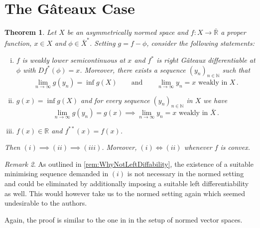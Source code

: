 \documentclass[
	paper=A4,
	pagesize=auto,
	fontsize=12pt
]{scrartcl}
\theoremstyle{plain}
\newtheorem{theorem}{Theorem}[section]
\theoremstyle{remark}
\newtheorem{remark}[theorem]{Remark}
\theoremstyle{definition}
\begin{document}
\section{The Gâteaux Case}
%
\begin{theorem}
Let $X$ be an asymmetrically normed space and $f : X \to \overline{\mathbb{R}}$ a proper function, $x \in X$ and $\phi \in \bar{X}^*$.
Setting $g = f - \phi$, consider the following statements:
%
\begin{enumerate}[(i)]
\item $f$ is weakly lower semicontinuous at $x$ and $f^*$ is right Gâteaux differentiable at $\phi$ with $D f^* (\phi) = x$.
Moreover, there exists a sequence $(y_n)_{n \in \mathbb{N}}$ such that
\begin{equation}
\lim_{n \to \infty} g(y_n) = \inf g(X) \qquad\text{and}\qquad \lim_{n \to \infty} y_n = x \text{ weakly in } X \, .
\end{equation}
\item $g(x) =  \inf g(X)$ and for every sequence $(y_n)_{n \in \mathbb{N}}$ in $X$ we have
\begin{equation}
 \lim_{n \to \infty} g(y_n) = g(x) \implies \lim_{n \to \infty} y_n = x \text{ weakly in } \bar{X} \, .
\end{equation}
\item $f(x) \in \mathbb{R}$ and $f^{**}(x) = f(x)$.
\end{enumerate}
%
Then $(i) \implies (ii) \implies (iii)$.
Moreover, $(i) \iff (ii)$ whenever $f$ is convex.
\end{theorem}
%
\begin{remark}
As outlined in \cref{rem:WhyNotLeftDiffability}, the existence of a suitable minimising sequence demanded in $(i)$ is not necessary in the normed setting and could be eliminated by additionally imposing a suitable left differentiability as well.
This would however take us to the normed setting again which seemed undesirable to the authors.
\end{remark}
%
Again, the proof is similar to the one in \cite[Theorem 3.9.1]{src:Zalinescu:ConvexAnalysisInGeneralVectorSpaces} in the setup of normed vector spaces.
%
\end{document}

